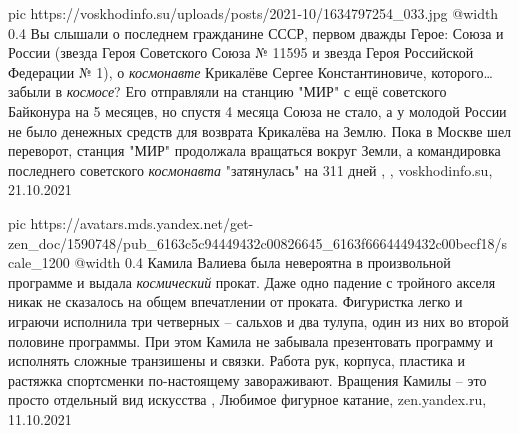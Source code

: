\ifcmt
  pic https://voskhodinfo.su/uploads/posts/2021-10/1634797254_033.jpg
  @width 0.4
\fi
Вы слышали о последнем гражданине СССР, первом дважды Герое: Союза и России
(звезда Героя Советского Союза № 11595 и звезда Героя Российской Федерации №
1), о \emph{космонавте} Крикалёве Сергее Константиновиче, которого… забыли в
\emph{космосе}?  Его отправляли на станцию "МИР" с ещё советского Байконура на
5 месяцев, но спустя 4 месяца Союза не стало, а у молодой России не было
денежных средств для возврата Крикалёва на Землю. Пока в Москве шел переворот,
станция "МИР" продолжала вращаться вокруг Земли, а командировка последнего
советского \emph{космонавта} "затянулась" на 311 дней
, , voskhodinfo.su, 21.10.2021

\ifcmt
  pic https://avatars.mds.yandex.net/get-zen_doc/1590748/pub_6163c5c94449432c00826645_6163f6664449432c00becf18/scale_1200
  @width 0.4
\fi
Камила Валиева была невероятна в произвольной программе и выдала \emph{космический}
прокат. Даже одно падение с тройного акселя никак не сказалось на общем
впечатлении от проката. Фигуристка легко и играючи исполнила три четверных –
сальхов и два тулупа, один из них во второй половине программы. При этом Камила
не забывала презентовать программу и исполнять сложные транзишены и связки.
Работа рук, корпуса, пластика и растяжка спортсменки по-настоящему
завораживают. Вращения Камилы – это просто отдельный вид искусства
, 
Любимое фигурное катание, zen.yandex.ru, 11.10.2021 
